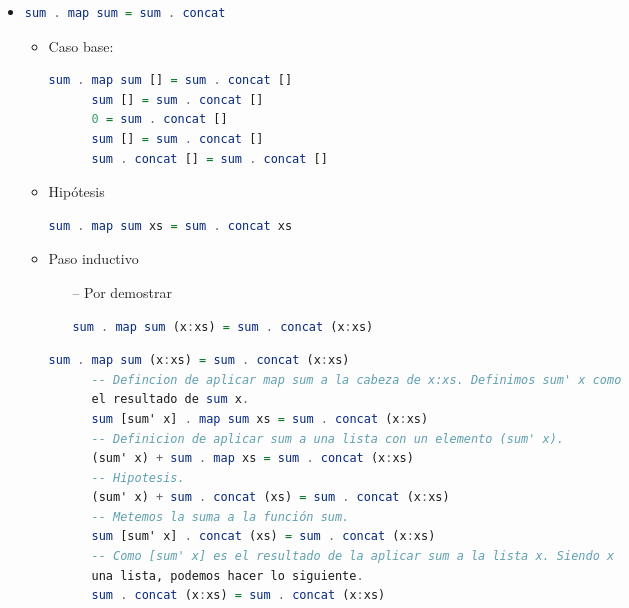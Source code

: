 \documentclass[spanish,12pt,letterpaper]{article}
\begin{document}
\begin{itemize}
\item
  \begin{lstlisting}[language=Haskell]
    sum . map sum = sum . concat
  \end{lstlisting}
  \begin{itemize}
    \item Caso base:
    \begin{lstlisting}[language=Haskell]
      sum . map sum [] = sum . concat []
      sum [] = sum . concat []
      0 = sum . concat []
      sum [] = sum . concat []
      sum . concat [] = sum . concat []
    \end{lstlisting}
  \item Hipótesis
    \begin{lstlisting}[language=Haskell]
      sum . map sum xs = sum . concat xs
    \end{lstlisting}
  \item Paso inductivo
    \begin{itemize}
    \item [--] Por demostrar
      \begin{lstlisting}[language=Haskell]
        sum . map sum (x:xs) = sum . concat (x:xs)
      \end{lstlisting}
    \end{itemize}
    \begin{lstlisting}[language=Haskell]
      sum . map sum (x:xs) = sum . concat (x:xs)
      -- Defincion de aplicar map sum a la cabeza de x:xs. Definimos sum' x como
      el resultado de sum x.
      sum [sum' x] . map sum xs = sum . concat (x:xs)
      -- Definicion de aplicar sum a una lista con un elemento (sum' x).
      (sum' x) + sum . map xs = sum . concat (x:xs)
      -- Hipotesis.
      (sum' x) + sum . concat (xs) = sum . concat (x:xs)
      -- Metemos la suma a la función sum.
      sum [sum' x] . concat (xs) = sum . concat (x:xs)
      -- Como [sum' x] es el resultado de la aplicar sum a la lista x. Siendo x
      una lista, podemos hacer lo siguiente.
      sum . concat (x:xs) = sum . concat (x:xs)
    \end{lstlisting}
  \end{itemize}


\end{itemize}
\end{document}
